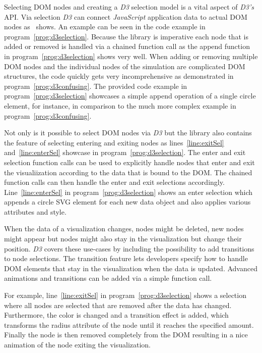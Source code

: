 Selecting DOM nodes and creating a \emph{D3} selection model is a vital aspect of \emph{D3's} API. Via selection \emph{D3} can connect \emph{JavaScript} application data to actual DOM nodes as~\cite{D3Github} shows. An example can be seen in the code example in program~\ref{prog:d3selection}. Because the library is imperative each node that is added or removed is handled via a chained function call as the append function in program~\ref{prog:d3selection} shows very well. When adding or removing multiple DOM nodes and the individual nodes of the simulation are complicated DOM structures, the code quickly gets very incomprehensive as demonstrated in program~\ref{prog:d3confusing}. The provided code example in program~\ref{prog:d3selection} showcases a simple append operation of a single circle element, for instance, in comparison to the much more complex example in program~\ref{prog:d3confusing}. 

Not only is it possible to select DOM nodes via \emph{D3} but the library also contains the feature of selecting entering and exiting nodes as lines~\ref{line:exitSel} and~\ref{line:enterSel} showcase in program~\ref{prog:d3selection}. The enter and exit selection function calls can be used to explicitly handle nodes that enter and exit the visualiization according to the data that is bound to the DOM. The chained function calls can then handle the enter and exit selections accordingly. Line~\ref{line:enterSel} in program~\ref{prog:d3selection} shows an enter selection which appends a circle SVG element for each new data object and also applies various attributes and style.

When the data of a visualization changes, nodes might be deleted, new nodes might appear but nodes might also stay in the visualization but change their position. \emph{D3} covers these use-cases by including the possibility to add transitions to node selections. The transition feature lets developers specify how to handle DOM elements that stay in the visualization when the data is updated. Advanced animations and transitions can be added via a simple function call. 

For example, line~\ref{line:exitSel} in program~\ref{prog:d3selection} shows a selection where all nodes are selected that are removed after the data has changed. Furthermore, the color is changed and a transition effect is added, which transforms the radius attribute of the node until it reaches the specified amount. Finally the node is then removed completely from the DOM resulting in a nice animation of the node exiting the visualization.

